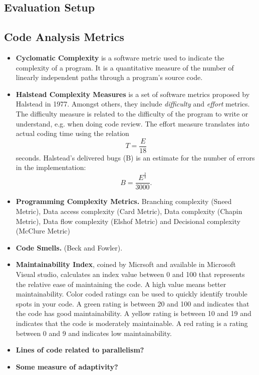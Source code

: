 \subsection{Evaluation Setup}

\subsection{Code Analysis Metrics}

\begin{itemize}
    \item \textbf{Cyclomatic Complexity} is a software metric used to indicate the complexity of a program. It is a quantitative measure of the number of linearly independent paths through a program's source code.
    \item \textbf{Halstead Complexity Measures} is a set of software metrics proposed by Halstead in 1977. Amongst others, they include \emph{difficulty} and \emph{effort} metrics. The difficulty measure is related to the difficulty of the program to write or understand, e.g. when doing code review. The effort measure translates into actual coding time using the relation $$T=\frac{E}{18}$$ seconds. Halstead's delivered bugs (B) is an estimate for the number of errors in the implementation:
    $$B=\frac{E^{\frac{2}{3}}}{3000}.$$
    \item \textbf{Programming Complexity Metrics.} Branching complexity (Sneed Metric), Data access complexity (Card Metric), Data complexity (Chapin Metric), Data flow complexity (Elshof Metric) and Decisional complexity (McClure Metric) 
    \item \textbf{Code Smells.} (Beck and Fowler). 
    \item \textbf{Maintainability Index}, coined by Micrsoft and available in Microsoft Visual studio, calculates an index value between 0 and 100 that represents the relative ease of maintaining the code. A high value means better maintainability. Color coded ratings can be used to quickly identify trouble spots in your code. A green rating is between 20 and 100 and indicates that the code has good maintainability. A yellow rating is between 10 and 19 and indicates that the code is moderately maintainable. A red rating is a rating between 0 and 9 and indicates low maintainability.
    \item \textbf{Lines of code related to parallelism?}
    \item \textbf{Some measure of adaptivity?}
\end{itemize}

